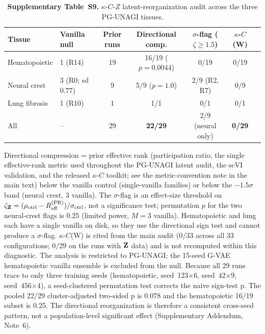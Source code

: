 \documentclass[11pt,a4paper]{article}
\begin{document}
\begin{table}[ht]
\centering
\caption*{\textbf{Supplementary Table~S9.} $\kappa$-$C$-$Z$ latent-reorganization audit across the three PG-UNAGI tissues.}
\small
\setlength{\tabcolsep}{4pt}
\begin{tabular}{@{}llccccc@{}}
\toprule
\textbf{Tissue} & \textbf{Vanilla null} & \textbf{Prior runs} & \textbf{Directional comp.} & \textbf{$\sigma$-flag ($\zeta\geq1.5$)} & \textbf{$\kappa$-$C$(W)} \\
\midrule
Hematopoietic & 1 (R14) & 19 & 16/19 ($p=0.0044$) & 0/19 & 0/19 \\
Neural crest & 3 (R0; sd 0.77) & 9 & 5/9 ($p=1.0$) & 2/9 (R2, R7) & 0/9 \\
Lung fibrosis & 1 (R10) & 1 & 1/1 & 0/1 & 0/1 \\
\midrule
All & -- & 29 & \textbf{22/29} & 2/9 (neural only) & \textbf{0/29} \\
\bottomrule
\end{tabular}
\vspace{4pt}
\footnotesize{Directional compression = prior effective rank (participation ratio, the single effective-rank metric used throughout the PG-UNAGI latent audit, the scVI validation, and the released $\kappa$-$C$ toolkit; see the metric-convention note in the main text) below the vanilla control (single-vanilla families) or below the $-1.5\sigma$ band (neural crest, 3 vanilla). The $\sigma$-flag is an effect-size threshold on $\zeta_{\mathbf{Z}}=(\mu_{\mathrm{ctrl}}-R_{\mathrm{eff}}^{(\mathrm{PR})})/\sigma_{\mathrm{ctrl}}$, not a significance test; permutation $p$ for the two neural-crest flags is 0.25 (limited power, $M=3$ vanilla). Hematopoietic and lung each have a single vanilla on disk, so they use the directional sign test and cannot produce a $\sigma$-flag. $\kappa$-$C$(W) is cited from the main audit ($0/33$ across all 33 configurations; $0/29$ on the runs with $\mathbf{Z}$ data) and is not recomputed within this diagnostic. The analysis is restricted to PG-UNAGI; the 15-seed G-VAE hematopoietic vanilla ensemble is excluded from the null. Because all 29 runs trace to only three training seeds (hematopoietic, seed~123$\times$6, seed~42$\times$9, seed~456$\times$4), a seed-clustered permutation test corrects the naive sign-test p. The pooled 22/29 cluster-adjusted two-sided p is 0.078 and the hematopoietic 16/19 subset is 0.25. The directional reorganization is therefore a consistent cross-seed pattern, not a population-level significant effect (Supplementary Addendum, Note~6).}
\label{tab:kcz}
\end{table}
\end{document}
